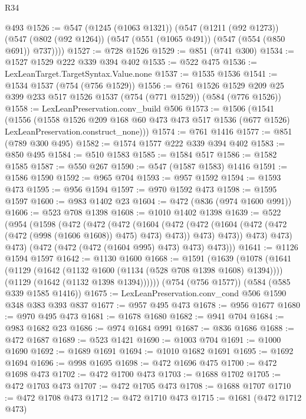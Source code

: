 \begin{lexlean}{R34}
\begin{coremodule}
    @493
@1526 := @547
    (@1245 (@1063 @1321))
    (@547
      (@1211 (@92 @1273))
      (@547 (@802 (@92 @1264)) (@547 (@551 (@1065 @491)) (@547 (@554 (@850 @691)) @737))))
@1527 := @728 @1526
@1529 := @851 (@741 @300)
@1534 := @1527 @1529 @222 @339 @394 @402
@1535 := @522 @475
@1536 := LexLeanTarget.TargetSyntax.Value.none
@1537 := @1535 @1536
@1541 := @1534 @1537 (@754 (@756 @1529))
@1556 := @761
    @1526
    @1529
    @209
    @25
    @399
    @233
    @517
    @1526
    @1537
    (@754 (@771 @1529))
    (@584 (@776 @1526))
@1558 := LexLeanPreservation.conv_build @506
@1573 := @1506
    (@1541
      (@1556
        (@1558
          @1526
          @209
          @168
          @60
          @473
          @473
          @517
          @1536
          (@677 @1526)
          LexLeanPreservation.construct_none)))
@1574 := @761 @1416
@1577 := @851 (@789 @300 @495)
@1582 := @1574 @1577 @222 @339 @394 @402
@1583 := @850 @495
@1584 := @510 @1583
@1585 := @1584 @517
@1586 := @1582 @1585
@1587 := @550 @267
@1590 := @547 (@1587 @1583) @1416
@1591 := @1586 @1590
@1592 := @965 @704
@1593 := @957 @1592
@1594 := @1593 @473
@1595 := @956 @1594
@1597 := @970 @1592 @473
@1598 := @1595 @1597
@1600 := @983 @1402 @23
@1604 := @472 (@836 (@974 @1600 @991))
@1606 := @523 @708 @1398
@1608 := @1010 @1402 @1398
@1639 := @522
    (@954
      (@1598
        (@472
          (@472
            (@472
              (@1604
                (@472
                  (@472 (@1604 (@472 (@472 (@472 (@998 (@1606 @1608)) @475) @473) @473)) @473)
                  @473))
              @473)
            @473)
          @473)
        (@472 (@472 (@472 (@1604 @995) @473) @473) @473)))
@1641 := @1126 @1594 @1597
@1642 := @1130 @1600
@1668 := @1591
    (@1639
      (@1078
        (@1641
          (@1129 (@1642 (@1132 @1600 (@1134 (@528 @708 @1398 @1608) @1394))))
          (@1129 (@1642 (@1132 @1398 @1394))))))
    (@754 (@756 @1577))
    (@584 (@585 @339 @1585 @1416))
@1675 := LexLeanPreservation.conv_cond @506 @1590 @348 @383 @393 @837
@1677 := @957 @495 @473
@1678 := @956 @1677
@1680 := @970 @495 @473
@1681 := @1678 @1680
@1682 := @941 @704
@1684 := @983 @1682 @23
@1686 := @974 @1684 @991
@1687 := @836 @1686
@1688 := @472 @1687
@1689 := @523 @1421
@1690 := @1003 @704
@1691 := @1000 @1690
@1692 := @1689 @1691
@1694 := @1010 @1682 @1691
@1695 := @1692 @1694
@1696 := @998 @1695
@1698 := @472 @1696 @475
@1700 := @472 @1698 @473
@1702 := @472 @1700 @473
@1703 := @1688 @1702
@1705 := @472 @1703 @473
@1707 := @472 @1705 @473
@1708 := @1688 @1707
@1710 := @472 @1708 @473
@1712 := @472 @1710 @473
@1715 := @1681 (@472 @1712 @473)

\end{coremodule}
\end{lexlean}
